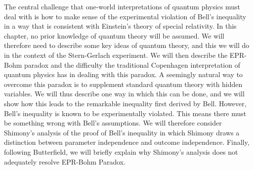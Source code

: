     The central challenge that one-world interpretations of quantum physics must deal with is how to make sense of the experimental violation of Bell's inequality in a way that is consistent with Einstein's theory of special relativity.  In this chapter, no  prior knowledge of quantum theory will be assumed. We will therefore need to describe some key ideas of quantum theory, and this we will do in the context of the  Stern-Gerlach experiment. 
    We will then describe the EPR-Bohm paradox and the difficulty the traditional Copenhagen interpretation of quantum physics has in dealing with this paradox. A seemingly natural way to overcome this paradox is to supplement standard quantum theory with hidden variables. We will thus describe one way in which this can be done, and we will show how this leads to the remarkable inequality first derived by Bell. However, Bell's inequality is known to be experimentally violated. This means there must be something wrong with Bell's assumptions. We will therefore consider Shimony's analysis of the proof of Bell's inequality in which Shimony draws a distinction between parameter independence and outcome independence. Finally, following Butterfield, we will briefly explain why Shimony's analysis does not adequately resolve EPR-Bohm Paradox. 


    